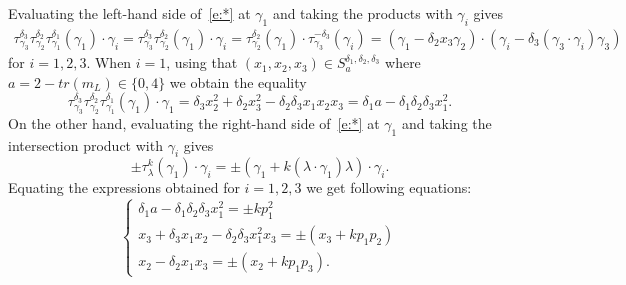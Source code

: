 \documentclass[11pt,a4paper]{amsart}
\newcommand{\de}{\delta}
\newcommand{\ga}{\gamma}
\newcommand{\la}{\lambda}
\newcommand{\tr}{tr}
\theoremstyle{definition}
\numberwithin{equation}{section}
\begin{document}
Evaluating the left-hand side of~\eqref{e:*} at $\ga_1$ and taking the products with $\ga_i$ gives 
\[
\begin{split}
\tau^{\de_3}_{\gamma_3} \tau^{\de_2}_{\gamma_2} \tau^{\de_1}_{\gamma_1}(\ga_1) \cdot \ga_i=
\tau^{\de_3}_{\gamma_3} \tau^{\de_2}_{\gamma_2}(\ga_1) \cdot \ga_i=
\tau^{\de_2}_{\gamma_2}(\ga_1) \cdot \tau^{-\de_3}_{\gamma_3}(\ga_i)=
(\ga_1-\de_2 x_3 \ga_2) \cdot (\ga_i-\de_3 (\ga_3 \cdot \ga_i) \ga_3)
\end{split} 
\]
for $i=1,2,3$. When $i=1$, using that $(x_1,x_2,x_3) \in S_a^{\de_1,\de_2,\de_3}$ where $a=2-\tr (m_L) \in \{0,4\}$
we obtain the equality  
\[
\tau^{\de_3}_{\gamma_3} \tau^{\de_2}_{\gamma_2} \tau^{\de_1}_{\gamma_1}(\ga_1) \cdot \ga_1=
\de_3x_2^2+\de_2 x_3^2-\de_2 \de_3 x_1x_2x_3=\de_1 a-\de_1\de_2\de_3x_1^2.
\]
On the other hand, evaluating the right-hand side of~\eqref{e:*} at $\ga_1$ and taking the intersection product with $\ga_i$ gives \[
\pm \tau_\la^k(\ga_1) \cdot \ga_i=\pm(\ga_1+k(\la \cdot \ga_1) \la) \cdot \ga_i.
\]
Equating the expressions obtained for $i=1,2,3$ we get following equations: 
\begin{equation}\label{e:xp-equations}
\begin{cases}
\de_1 a-\de_1\de_2\de_3x_1^2 = \pm k p_1^2\\
x_3+\de_3x_1x_2-\de_2\de_3x_1^2x_3 = \pm (x_3+kp_1p_2)\\
x_2-\de_2 x_1 x_3 = \pm (x_2+kp_1p_3).
\end{cases}
\end{equation}
\end{document}
